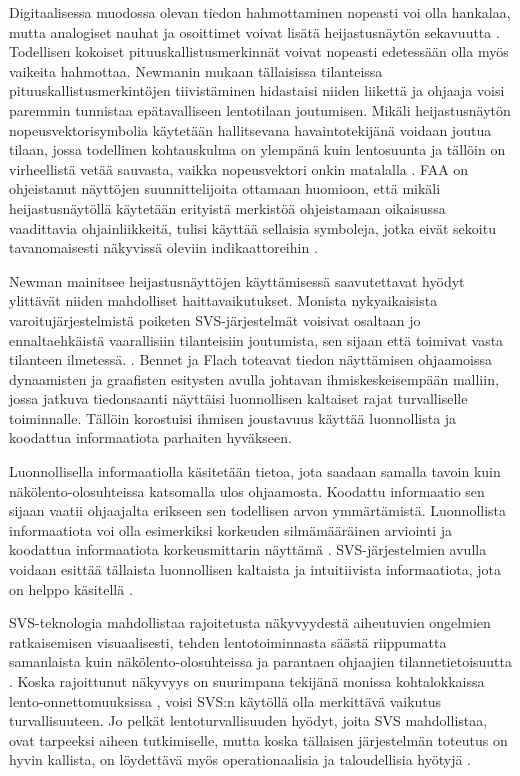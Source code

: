 \documentclass[utf8,bachelor,manualbib]{gradu3}
\begin{document}
Digitaalisessa muodossa olevan tiedon hahmottaminen nopeasti voi olla hankalaa, mutta analogiset nauhat ja osoittimet voivat lisätä heijastusnäytön sekavuutta \citeyearpar{zuschlag2003}. Todellisen kokoiset pituuskallistusmerkinnät voivat nopeasti edetessään olla myös vaikeita hahmottaa. Newmanin \citeyearpar{newman1995} mukaan tällaisissa tilanteissa pituuskallistusmerkintöjen tiivistäminen hidastaisi niiden liikettä ja ohjaaja voisi paremmin tunnistaa epätavalliseen lentotilaan joutumisen. Mikäli heijastusnäytön nopeusvektorisymbolia käytetään hallitsevana havaintotekijänä voidaan joutua tilaan, jossa todellinen kohtauskulma on ylempänä kuin lentosuunta ja tällöin on virheellistä vetää sauvasta, vaikka nopeusvektori onkin matalalla \citep{crawfordneal2006}. FAA on ohjeistanut näyttöjen suunnittelijoita ottamaan huomioon, että mikäli heijastusnäytöllä käytetään erityistä merkistöä ohjeistamaan oikaisussa vaadittavia ohjainliikkeitä, tulisi käyttää sellaisia symboleja, jotka eivät sekoitu tavanomaisesti näkyvissä oleviin indikaattoreihin \citep{crawfordneal2006}.

Newman \citeyearpar{newman2000} mainitsee heijastusnäyttöjen käyttämisessä saavutettavat hyödyt ylittävät niiden mahdolliset haittavaikutukset. Monista nykyaikaisista varoitujärjestelmistä poiketen SVS-järjestelmät voisivat osaltaan jo ennaltaehkäistä vaarallisiin tilanteisiin joutumista, sen sijaan että toimivat vasta tilanteen ilmetessä. \citep{schnellym2004}. Bennet ja Flach \citeyearpar{bennetflach1994} toteavat tiedon näyttämisen ohjaamoissa dynaamisten ja graafisten esitysten avulla johtavan ihmiskeskeisempään malliin, jossa jatkuva tiedonsaanti näyttäisi luonnollisen kaltaiset rajat turvalliselle toiminnalle. Tällöin korostuisi ihmisen joustavuus käyttää luonnollista ja koodattua informaatiota parhaiten hyväkseen.

Luonnollisella informaatiolla käsitetään tietoa, jota saadaan samalla tavoin kuin näkölento-olosuhteissa katsomalla ulos ohjaamosta. Koodattu informaatio sen sijaan vaatii ohjaajalta erikseen sen todellisen arvon ymmärtämistä. Luonnollista informaatiota voi olla esimerkiksi korkeuden silmämääräinen arviointi ja koodattua informaatiota korkeusmittarin näyttämä \citep{prinzel2004}. SVS-järjestelmien avulla voidaan esittää tällaista luonnollisen kaltaista ja intuitiivista informaatiota, jota on helppo käsitellä \citep{wickensandre1990}.

SVS-teknologia mahdollistaa rajoitetusta näkyvyydestä aiheutuvien ongelmien ratkaisemisen visuaalisesti, tehden lentotoiminnasta säästä riippumatta samanlaista kuin näkölento-olosuhteissa ja parantaen ohjaajien tilannetietoisuutta \citep{prinzel2004}. Koska rajoittunut näkyvyys on suurimpana tekijänä monissa kohtalokkaissa lento-onnettomuuksissa \citep{boeing1996}, voisi SVS:n käytöllä olla merkittävä vaikutus turvallisuuteen. Jo pelkät lentoturvallisuuden hyödyt, joita SVS mahdollistaa, ovat tarpeeksi aiheen tutkimiselle, mutta koska tällaisen järjestelmän toteutus on hyvin kallista, on löydettävä myös operationaalisia ja taloudellisia hyötyjä \citep{prinzel2004}.
\end{document}
